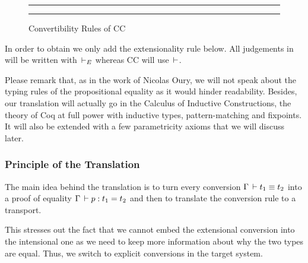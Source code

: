 \documentclass[11pt]{article}
\theoremstyle{plain}
\theoremstyle{remark}
\begin{document}
\begin{figure}[h]
  \hrule \vspace*{2ex}%

  \begin{mathc}
    \qquad
  \end{mathc}

  \begin{mathc}
  \end{mathc}

  \begin{mathc}
  \end{mathc}

  \hrule%

  \caption{Convertibility Rules of CC}
  \label{fig:cc-conv}
\end{figure}

In order to obtain \CCe we only add the extensionality rule below.
All judgements in \CCe will be written with $\,\vdash_E$ whereas CC will use $\,\vdash$.
\begin{mathc}
\end{mathc}

Please remark that, as in the work of Nicolas Oury, we will not speak about the
typing rules of the propositional equality as it would hinder readability.
Besides, our translation will actually go in the Calculus of Inductive
Constructions, the theory of Coq at full power with inductive types,
pattern-matching and fixpoints. It will also be extended with a few
parametricity axioms that we will discuss later.

\subsubsection{Principle of the Translation}

The main idea behind the translation is to turn every conversion
$\Gamma \,\vdash t_1 \equiv t_2$ into a proof of equality
$\Gamma \,\vdash p : t_1 = t_2$ and then to translate the conversion
rule to a transport.
\begin{mathc}
\end{mathc}
This stresses out the fact that we cannot embed the extensional
conversion into the intensional one as we need to keep more information
about why the two types are equal. Thus, we switch to explicit
conversions in the target system.
\end{document}
